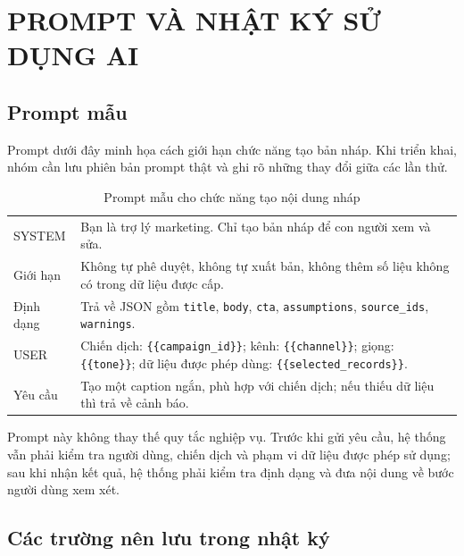 \chapter{PROMPT VÀ NHẬT KÝ SỬ DỤNG AI}

\section{Prompt mẫu}

Prompt dưới đây minh họa cách giới hạn chức năng tạo bản nháp. Khi triển khai, nhóm cần lưu phiên bản prompt thật và ghi rõ những thay đổi giữa các lần thử.

\begin{table}[!htbp]
\centering
\small
\renewcommand{\arraystretch}{1.15}
\caption{Prompt mẫu cho chức năng tạo nội dung nháp}
\label{tab:v8-prompt-appendix}
\begin{tabularx}{\textwidth}{|L{2.4cm}|Y|}
\hline
{} & \\
\hline
SYSTEM & Bạn là trợ lý marketing. Chỉ tạo bản nháp để con người xem và sửa.\\
\hline
Giới hạn & Không tự phê duyệt, không tự xuất bản, không thêm số liệu không có trong dữ liệu được cấp.\\
\hline
Định dạng & Trả về JSON gồm \texttt{title}, \texttt{body}, \texttt{cta}, \texttt{assumptions}, \texttt{source\_ids}, \texttt{warnings}.\\
\hline
USER & Chiến dịch: \texttt{\{\{campaign\_id\}\}}; kênh: \texttt{\{\{channel\}\}}; giọng: \texttt{\{\{tone\}\}}; dữ liệu được phép dùng: \texttt{\{\{selected\_records\}\}}.\\
\hline
Yêu cầu & Tạo một caption ngắn, phù hợp với chiến dịch; nếu thiếu dữ liệu thì trả về cảnh báo.\\
\hline
\end{tabularx}
\end{table}

Prompt này không thay thế quy tắc nghiệp vụ. Trước khi gửi yêu cầu, hệ thống vẫn phải kiểm tra người dùng, chiến dịch và phạm vi dữ liệu được phép sử dụng; sau khi nhận kết quả, hệ thống phải kiểm tra định dạng và đưa nội dung về bước người dùng xem xét.

\section{Các trường nên lưu trong nhật ký}

